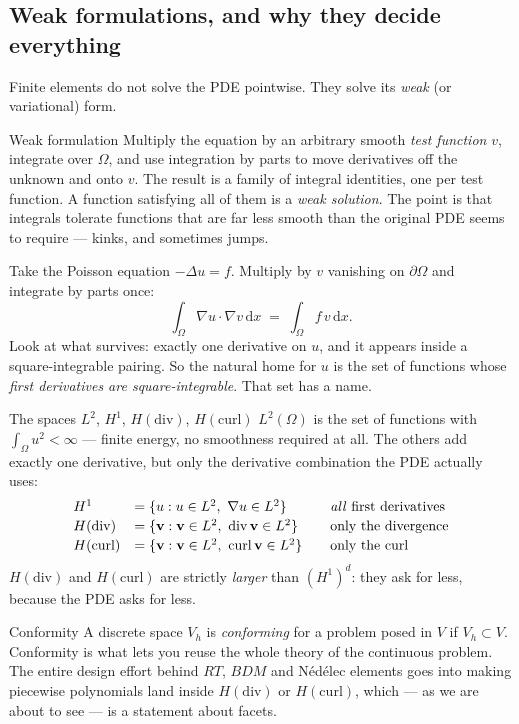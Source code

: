 \documentclass[11pt,a4paper]{article}
\newcommand{\Hdiv}{H(\mathrm{div})}
\newcommand{\Hcurl}{H(\mathrm{curl})}
\newcommand{\dv}{\operatorname{div}}
\newcommand{\curl}{\operatorname{curl}}
\newcommand{\dx}{\,\mathrm{d}x}
\newcommand{\bv}{\mathbf{v}}
\begin{document}
\subsection{Weak formulations, and why they decide everything}

Finite elements do not solve the PDE pointwise. They solve its \emph{weak} (or
variational) form.

\begin{jargon}{Weak formulation}
Multiply the equation by an arbitrary smooth \emph{test function} $v$,
integrate over $\Omega$, and use integration by parts to move derivatives off
the unknown and onto $v$. The result is a family of integral identities, one
per test function. A function satisfying all of them is a \emph{weak solution}.
The point is that integrals tolerate functions that are far less smooth than
the original PDE seems to require --- kinks, and sometimes jumps.
\end{jargon}

Take the Poisson equation $-\Delta u = f$. Multiply by $v$ vanishing on
$\partial\Omega$ and integrate by parts once:
\[
  \int_\Omega \nabla u \cdot \nabla v \dx \;=\; \int_\Omega f\, v \dx .
\]
Look at what survives: exactly one derivative on $u$, and it appears inside a
square-integrable pairing. So the natural home for $u$ is the set of functions
whose \emph{first derivatives are square-integrable}. That set has a name.

\begin{jargon}{The spaces $L^2$, $H^1$, $\Hdiv$, $\Hcurl$}
$L^2(\Omega)$ is the set of functions with $\int_\Omega u^2 < \infty$ --- finite
energy, no smoothness required at all. The others add exactly one derivative,
but only the derivative combination the PDE actually uses:
\[
\begin{array}{llll}
  H^1     &=\{u : u \in L^2,\ \nabla u \in L^2\}
          &\quad\text{\emph{all} first derivatives}\\[2pt]
  \Hdiv   &=\{\bv : \bv \in L^2,\ \dv \bv \in L^2\}
          &\quad\text{only the divergence}\\[2pt]
  \Hcurl  &=\{\bv : \bv \in L^2,\ \curl \bv \in L^2\}
          &\quad\text{only the curl}
\end{array}
\]
$\Hdiv$ and $\Hcurl$ are strictly \emph{larger} than $(H^1)^d$: they ask for
less, because the PDE asks for less.
\end{jargon}

\begin{jargon}{Conformity}
A discrete space $V_h$ is \emph{conforming} for a problem posed in $V$ if
$V_h \subset V$. Conformity is what lets you reuse the whole theory of the
continuous problem. The entire design effort behind $RT$, $BDM$ and Nédélec
elements goes into making piecewise polynomials land inside $\Hdiv$ or
$\Hcurl$, which --- as we are about to see --- is a statement about facets.
\end{jargon}
\end{document}
